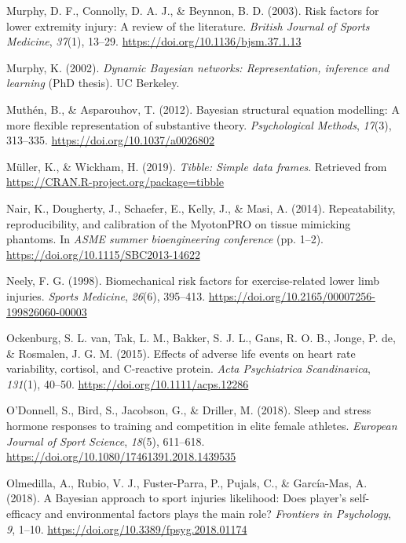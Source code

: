 \documentclass[
  english,
  man,floatsintext]{apa6}
\begin{document}
\leavevmode\hypertarget{ref-Murphy2003}{}%
Murphy, D. F., Connolly, D. A. J., \& Beynnon, B. D. (2003). Risk factors for lower extremity injury: A review of the literature. \emph{British Journal of Sports Medicine}, \emph{37}(1), 13--29. \url{https://doi.org/10.1136/bjsm.37.1.13}

\leavevmode\hypertarget{ref-Murphy2002}{}%
Murphy, K. (2002). \emph{Dynamic Bayesian networks: Representation, inference and learning} (PhD thesis). UC Berkeley.

\leavevmode\hypertarget{ref-Muthen2012}{}%
Muthén, B., \& Asparouhov, T. (2012). Bayesian structural equation modelling: A more flexible representation of substantive theory. \emph{Psychological Methods}, \emph{17}(3), 313--335. \url{https://doi.org/10.1037/a0026802}

\leavevmode\hypertarget{ref-R-tibble}{}%
Müller, K., \& Wickham, H. (2019). \emph{Tibble: Simple data frames}. Retrieved from \url{https://CRAN.R-project.org/package=tibble}

\leavevmode\hypertarget{ref-Nair2014}{}%
Nair, K., Dougherty, J., Schaefer, E., Kelly, J., \& Masi, A. (2014). Repeatability, reproducibility, and calibration of the MyotonPRO on tissue mimicking phantoms. In \emph{ASME summer bioengineering conference} (pp. 1--2). \url{https://doi.org/10.1115/SBC2013-14622}

\leavevmode\hypertarget{ref-Neely1998}{}%
Neely, F. G. (1998). Biomechanical risk factors for exercise-related lower limb injuries. \emph{Sports Medicine}, \emph{26}(6), 395--413. \url{https://doi.org/10.2165/00007256-199826060-00003}

\leavevmode\hypertarget{ref-VanOckenburg2015a}{}%
Ockenburg, S. L. van, Tak, L. M., Bakker, S. J. L., Gans, R. O. B., Jonge, P. de, \& Rosmalen, J. G. M. (2015). Effects of adverse life events on heart rate variability, cortisol, and C-reactive protein. \emph{Acta Psychiatrica Scandinavica}, \emph{131}(1), 40--50. \url{https://doi.org/10.1111/acps.12286}

\leavevmode\hypertarget{ref-ODonnell2018a}{}%
O'Donnell, S., Bird, S., Jacobson, G., \& Driller, M. (2018). Sleep and stress hormone responses to training and competition in elite female athletes. \emph{European Journal of Sport Science}, \emph{18}(5), 611--618. \url{https://doi.org/10.1080/17461391.2018.1439535}

\leavevmode\hypertarget{ref-Olmedilla2018}{}%
Olmedilla, A., Rubio, V. J., Fuster-Parra, P., Pujals, C., \& García-Mas, A. (2018). A Bayesian approach to sport injuries likelihood: Does player's self-efficacy and environmental factors plays the main role? \emph{Frontiers in Psychology}, \emph{9}, 1--10. \url{https://doi.org/10.3389/fpsyg.2018.01174}
\end{document}
